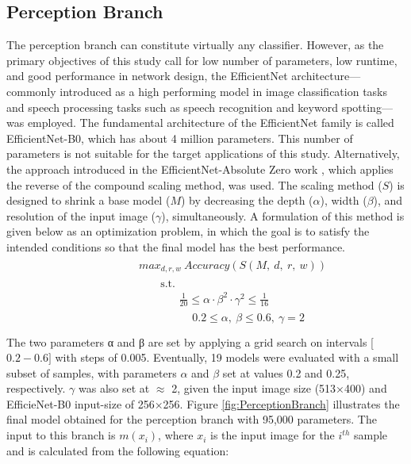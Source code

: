 \documentclass[a4paper]{article}
\begin{document}
\subsection{Perception Branch}
The perception branch can constitute virtually any classifier. However, as the primary objectives of this study call for low number of parameters, low runtime, and good performance in network design, the EfficientNet architecture—commonly introduced as a high performing model in image classification tasks and speech processing tasks such as speech recognition and keyword spotting—was employed. The fundamental architecture of the EfficientNet family is called EfficientNet-B0, which has about 4 million parameters. This number of parameters is not suitable for the target applications of this study. Alternatively, the approach introduced in the EfficientNet-Absolute Zero work \cite{21rostami2020efficientnet}, which applies the reverse of the compound scaling method, was used. The scaling method ($S$) is designed to shrink a base model ($M$) by decreasing the depth ($\alpha$), width ($\beta$), and resolution of the input image ($\gamma$), simultaneously. A formulation of this method is given below as an optimization problem, in which the goal is to satisfy the intended conditions so that the final model has the best performance.
$$
\begin{aligned}
&\begin{aligned}
max_{d,r,w}\ Accuracy(S(M,\ d,\ r,\ w))
\end{aligned}\\
&\qquad\text { s.t. }\\
&\qquad\qquad\frac{1}{20} \leq \alpha \cdot \beta^{2} \cdot \gamma^{2} \leq \frac{1}{16}\\
\qquad\qquad&\begin{aligned}
\qquad\qquad&0.2 \leq \alpha,\ \beta \leq 0.6,\ \gamma=2
 \\
\end{aligned}
\end{aligned}
$$
The two parameters α and β are set by applying a grid search on intervals [$0.2-0.6]$ with steps of 0.005. Eventually, 19 models were evaluated with a small subset of samples, with parameters $\alpha$ and $\beta$ set at values 0.2 and 0.25, respectively. $\gamma$ was also set at $\approx$ 2, given the input image size (513×400) and EfficieNet-B0 input-size of 256×256. Figure \ref{fig:PerceptionBranch} illustrates the final model obtained for the perception branch with 95,000 parameters.
The input to this branch is $m(x_i)$, where $x_i$ is the input image for the $i^{th}$ sample and is calculated from the following equation:
\end{document}
